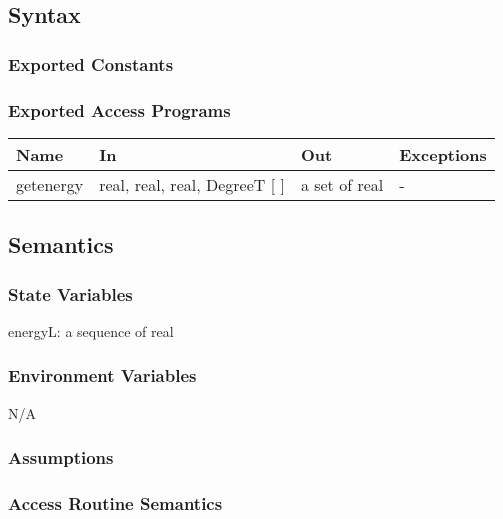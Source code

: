 \documentclass[12pt, titlepage]{article}
\begin{document}
\subsection{Syntax}

\subsubsection{Exported Constants}


\subsubsection{Exported Access Programs}

\begin{center}
\begin{tabular}{p{2cm} p{5cm} p{4cm} p{1cm}}
\hline
\textbf{Name} & \textbf{In} & \textbf{Out} & \textbf{Exceptions} \\
\hline 
getenergy & real, real, real, DegreeT [ ] & a set of real & - \\


\hline
\end{tabular}
\end{center}


\subsection{Semantics}

\subsubsection{State Variables}

energyL: a sequence of real\\

\subsubsection{Environment Variables}

N/A

\subsubsection{Assumptions}



\subsubsection{ Access Routine Semantics}
\end{document}
